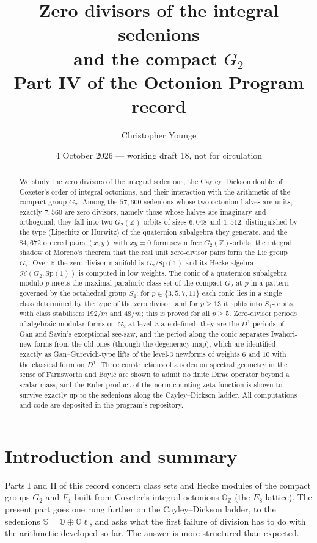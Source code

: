 \documentclass[11pt]{amsart}
\title[Zero divisors of the integral sedenions]{Zero divisors of the integral sedenions\\ and the compact $G_2$\\[4pt] {\normalsize Part IV of the Octonion Program record}}
\author{Christopher Younge}
\date{4 October 2026 --- working draft 18, not for circulation}
\theoremstyle{definition}
\renewcommand{\O}{\mathbb{O}}\newcommand{\Sd}{\mathbb{S}}\newcommand{\Hq}{\mathbb{H}}\newcommand{\Z}{\mathbb{Z}}\newcommand{\Q}{\mathbb{Q}}\newcommand{\R}{\mathbb{R}}\newcommand{\C}{\mathbb{C}}\newcommand{\F}{\mathbb{F}}
\begin{document}
\begin{abstract}
We study the zero divisors of the integral sedenions, the Cayley--Dickson double of Coxeter's order of integral octonions, and their interaction with the arithmetic of the compact group $G_2$. Among the $57{,}600$ sedenions whose two octonion halves are units, exactly $7{,}560$ are zero divisors, namely those whose halves are imaginary and orthogonal; they fall into two $G_2(\Z)$-orbits of sizes $6{,}048$ and $1{,}512$, distinguished by the type (Lipschitz or Hurwitz) of the quaternion subalgebra they generate, and the $84{,}672$ ordered pairs $(x,y)$ with $xy=0$ form seven free $G_2(\Z)$-orbits: the integral shadow of Moreno's theorem that the real unit zero-divisor pairs form the Lie group $G_2$. Over $\R$ the zero-divisor manifold is $G_2/\mathrm{Sp}(1)$ and its Hecke algebra $\mathcal H(G_2,\mathrm{Sp}(1))$ is computed in low weights. The conic of a quaternion subalgebra modulo $p$ meets the maximal-parahoric class set of the compact $G_2$ at $p$ in a pattern governed by the octahedral group $S_4$: for $p\in\{3,5,7,11\}$ each conic lies in a single class determined by the type of the zero divisor, and for $p\ge 13$ it splits into $S_4$-orbits, with class stabilisers $192/m$ and $48/m$; this is proved for all $p\ge 5$. Zero-divisor periods of algebraic modular forms on $G_2$ at level~3 are defined; they are the $D^1$-periods of Gan and Savin's exceptional see-saw, and the period along the conic separates Iwahori-new forms from the old ones (through the degeneracy map), which are identified exactly as Gan--Gurevich-type lifts of the level-$3$ newforms of weights $6$ and $10$ with the classical form on $D^1$. Three constructions of a sedenion spectral geometry in the sense of Farnsworth and Boyle are shown to admit no finite Dirac operator beyond a scalar mass, and the Euler product of the norm-counting zeta function is shown to survive exactly up to the sedenions along the Cayley--Dickson ladder. All computations and code are deposited in the program's repository.
\end{abstract}
\maketitle
\tableofcontents

\section{Introduction and summary}
Parts I and II of this record \cite{PartI,PartII} concern class sets and Hecke modules of the compact groups $G_2$ and $F_4$ built from Coxeter's integral octonions $\O_\Z$ (the $E_8$ lattice). The present part goes one rung further on the Cayley--Dickson ladder, to the sedenions $\Sd=\O\oplus\O\ell$, and asks what the first failure of division has to do with the arithmetic developed so far. The answer is more structured than expected.
\end{document}
